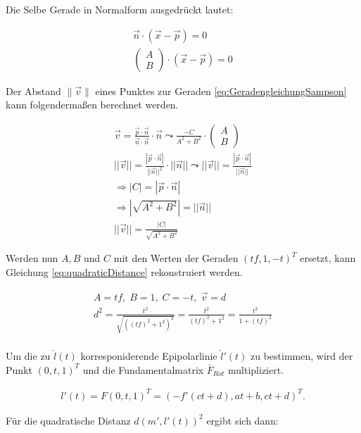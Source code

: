 Die Selbe Gerade in Normalform ausgedrückt lautet:

\begin{gather}
\vec{n}\cdot (\vec{x} - \vec{p}) = 0\\
	\begin{pmatrix}
	A\\B
	\end{pmatrix}
	\cdot
	(\vec{x} - \vec{p}) = 0\label{eq:GeradengleichungSampson}
\end{gather} 

Der Abstand $\parallel \vec{v} \parallel$ eines Punktes zur Geraden \ref{eq:GeradengleichungSampson} kann folgendermaßen berechnet werden.

\begin{gather}
	\vec{v} = \frac{\vec{p} \cdot \vec{n}}{\vec{n} \cdot \vec{n}} \cdot \vec{n}
	\leadsto \frac{-C}{A^2+B^2} \cdot \begin{pmatrix}
	A\\B
	\end{pmatrix}\\
	||\vec{v}|| = \frac{|\vec{p} \cdot \vec{n}|}{||\vec{n}||^2} \cdot ||\vec{n}|| \leadsto ||\vec{v}|| = \frac{|\vec{p} \cdot \vec{n}|}{||\vec{n}||}\\
	\Rightarrow |C| = |\vec{p} \cdot \vec{n}| \\
	\Rightarrow |\sqrt{A^2+B^2}| = ||\vec{n}||\\
	||\vec{v}|| = \frac{|C|}{\sqrt{A^2+B^2}}
\end{gather}

Werden nun $A,B$ und $C$ mit den Werten der Geraden $(tf,1,-t)^T$ ersetzt, kann Gleichung \ref{eq:quadraticDistance} rekonstruiert werden.

\begin{gather}
	A = tf, \; B= 1, \; C = -t, \; \vec{v} = d\\
	d^2 = \frac{t^2}{\sqrt{((tf)^2+1^2)^2}} = \frac{t^2}{(tf)^2+ 1^2} =  \frac{t^2}{1 + (tf)^2}
\end{gather}\\

Um die zu $\hat{l}(t)$ korresponiderende Epipolarlinie $\hat{l}'(t)$ zu bestimmen, wird der Punkt $(0,t,1)^T$ und die Fundamentalmatrix $\bar{F}_{Rot}$ multipliziert.

\begin{gather}
	l'(t) = F(0,t,1)^T = (-f'(ct+d),at+b,ct+d)^T.
\end{gather}

Für die quadratische Distanz $d(m',l'(t))^2$ ergibt sich dann:

